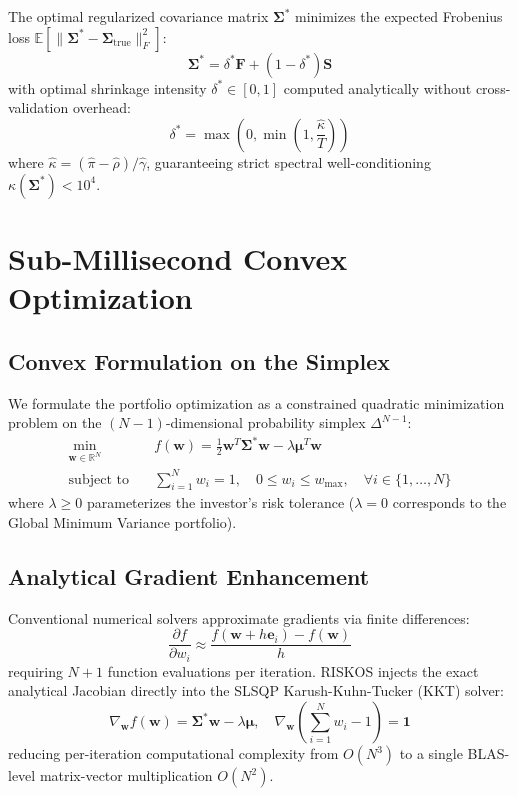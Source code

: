 \documentclass[10pt,journal,compsoc]{IEEEtran}
\begin{document}
The optimal regularized covariance matrix $\mathbf{\Sigma}^*$ minimizes the expected Frobenius loss $\mathbb{E}[\|\mathbf{\Sigma}^* - \mathbf{\Sigma}_{\text{true}}\|_F^2]$:
\begin{equation}
\mathbf{\Sigma}^* = \delta^* \mathbf{F} + (1 - \delta^*) \mathbf{S}
\end{equation}
with optimal shrinkage intensity $\delta^* \in [0, 1]$ computed analytically without cross-validation overhead:
\begin{equation}
\delta^* = \max \left(0, \min \left(1, \frac{\hat{\kappa}}{T}\right) \right)
\end{equation}
where $\hat{\kappa} = (\hat{\pi} - \hat{\rho}) / \hat{\gamma}$, guaranteeing strict spectral well-conditioning $\kappa(\mathbf{\Sigma}^*) < 10^4$.

\section{Sub-Millisecond Convex Optimization}
\label{sec:convex}

\subsection{Convex Formulation on the Simplex}
We formulate the portfolio optimization as a constrained quadratic minimization problem on the $(N-1)$-dimensional probability simplex $\Delta^{N-1}$:
\begin{equation}
\begin{aligned}
\min_{\mathbf{w} \in \mathbb{R}^N} \quad & f(\mathbf{w}) = \frac{1}{2} \mathbf{w}^T \mathbf{\Sigma}^* \mathbf{w} - \lambda \mathbf{\mu}^T \mathbf{w} \\
\text{subject to} \quad & \sum_{i=1}^N w_i = 1, \quad 0 \le w_i \le w_{\max}, \quad \forall i \in \{1, \dots, N\}
\end{aligned}
\label{eq:opt_problem}
\end{equation}
where $\lambda \ge 0$ parameterizes the investor's risk tolerance ($\lambda = 0$ corresponds to the Global Minimum Variance portfolio).

\subsection{Analytical Gradient Enhancement}
Conventional numerical solvers approximate gradients via finite differences:
\begin{equation}
\frac{\partial f}{\partial w_i} \approx \frac{f(\mathbf{w} + h \mathbf{e}_i) - f(\mathbf{w})}{h}
\end{equation}
requiring $N + 1$ function evaluations per iteration. RISKOS injects the exact analytical Jacobian directly into the SLSQP Karush-Kuhn-Tucker (KKT) solver:
\begin{equation}
\nabla_{\mathbf{w}} f(\mathbf{w}) = \mathbf{\Sigma}^* \mathbf{w} - \lambda \mathbf{\mu}, \quad \nabla_{\mathbf{w}} \left( \sum_{i=1}^N w_i - 1 \right) = \mathbf{1}
\end{equation}
reducing per-iteration computational complexity from $O(N^3)$ to a single BLAS-level matrix-vector multiplication $O(N^2)$.
\end{document}
